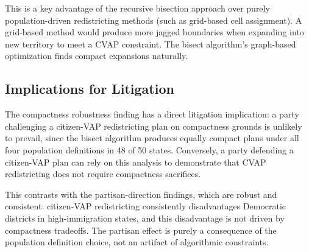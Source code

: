 This is a key advantage of the recursive bisection approach over purely population-driven redistricting methods (such as grid-based cell assignment). A grid-based method would produce more jagged boundaries when expanding into new territory to meet a CVAP constraint. The bisect algorithm's graph-based optimization finds compact expansions naturally.

\subsection{Implications for Litigation}

The compactness robustness finding has a direct litigation implication: a party challenging a citizen-VAP redistricting plan on compactness grounds is unlikely to prevail, since the bisect algorithm produces equally compact plans under all four population definitions in 48 of 50 states. Conversely, a party defending a citizen-VAP plan can rely on this analysis to demonstrate that CVAP redistricting does not require compactness sacrifices.

This contrasts with the partisan-direction findings, which are robust and consistent: citizen-VAP redistricting consistently disadvantages Democratic districts in high-immigration states, and this disadvantage is not driven by compactness tradeoffs. The partisan effect is purely a consequence of the population definition choice, not an artifact of algorithmic constraints.

